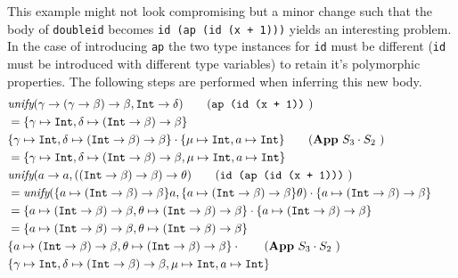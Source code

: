 \documentclass[11pt,oneside,a4paper]{report}
\begin{document}
\begin{exmp}
    This example might not look compromising but a minor change such that the body of \texttt{doubleid} becomes \texttt{id (ap (id (x + 1)))} yields an interesting problem.
    In the case of introducing \texttt{ap} the two type instances for \texttt{id} must be different (\texttt{id} must be introduced with different type variables) to retain it's polymorphic properties.
    The following steps are performed when inferring this new body.
\begin{align}
    &\textit{unify}(\gamma \rightarrow (\gamma \rightarrow \beta) \rightarrow \beta, \texttt{Int} \rightarrow \delta) \tag{\texttt{ap (id (x + 1))} }\\
    & = \{ \gamma \mapsto \texttt{Int}, \delta \mapsto (\texttt{Int} \rightarrow \beta) \rightarrow \beta \} \tag*{}\\
    &\{ \gamma \mapsto \texttt{Int}, \delta \mapsto (\texttt{Int} \rightarrow \beta) \rightarrow \beta \} \cdot \{ \mu \mapsto \texttt{Int}, a \mapsto \texttt{Int} \} \tag{\textbf{App} $S_3 \cdot S_2$ }\\
    & = \{ \gamma \mapsto \texttt{Int}, \delta \mapsto (\texttt{Int} \rightarrow \beta) \rightarrow \beta, \mu \mapsto \texttt{Int}, a \mapsto \texttt{Int} \} \tag*{}\\
    &\textit{unify}(a \rightarrow a, ((\texttt{Int} \rightarrow \beta) \rightarrow \beta) \rightarrow \theta) \tag{\texttt{id (ap (id (x + 1)))} }\\
    &= \textit{unify}(
     \{ a \mapsto  (\texttt{Int} \rightarrow \beta) \rightarrow \beta \} a,
     \{ a \mapsto  (\texttt{Int} \rightarrow \beta) \rightarrow \beta\} \theta
    ) \cdot \{ a \mapsto  (\texttt{Int} \rightarrow \beta) \rightarrow \beta\} \tag*{}\\
    &= \{ a \mapsto (\texttt{Int} \rightarrow \beta) \rightarrow \beta, \theta \mapsto (\texttt{Int} \rightarrow \beta) \rightarrow \beta \} \cdot \{ a \mapsto (\texttt{Int} \rightarrow \beta) \rightarrow \beta\} \tag*{}\\
    &= \{ a \mapsto (\texttt{Int} \rightarrow \beta) \rightarrow \beta, \theta \mapsto (\texttt{Int} \rightarrow \beta) \rightarrow \beta \} \tag*{}\\
    &\{ a \mapsto (\texttt{Int} \rightarrow \beta) \rightarrow \beta, \theta \mapsto (\texttt{Int} \rightarrow \beta) \rightarrow \beta \} \cdot \tag{\textbf{App} $S_3 \cdot S_2$ }\\
    &\{ \gamma \mapsto \texttt{Int}, \delta \mapsto (\texttt{Int} \rightarrow \beta) \rightarrow \beta, \mu \mapsto \texttt{Int}, a \mapsto \texttt{Int} \} \tag*{}

\end{align}
\end{exmp}
\end{document}
